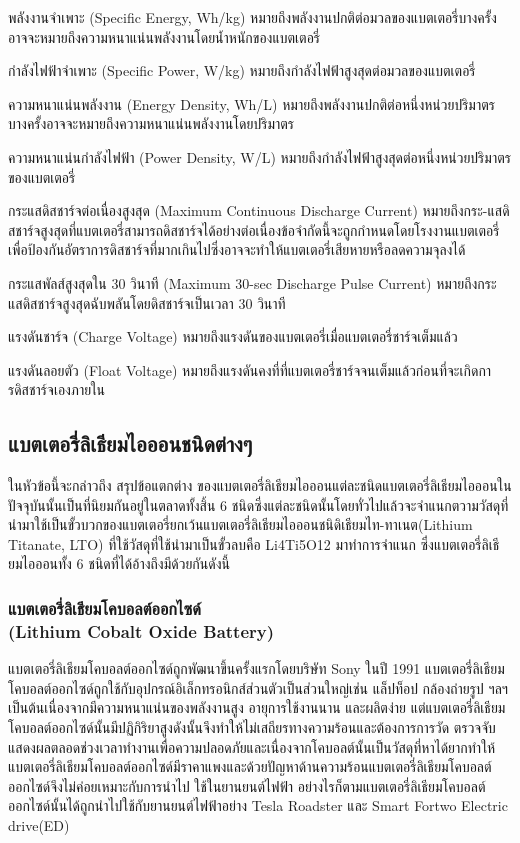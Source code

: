 \begin{itemize}
{		พลังงานจำเพาะ (Specific Energy, Wh/kg) หมายถึงพลังงานปกติต่อมวลของแบตเตอรี่บางครั้งอาจจะหมายถึงความหนาแน่นพลังงานโดยน้ำหนักของแบตเตอรี่}
	{\item
		กำลังไฟฟ้าจำเพาะ (Specific Power, W/kg) หมายถึงกำลังไฟฟ้าสูงสุดต่อมวลของแบตเตอรี่}
	{\item
		ความหนาแน่นพลังงาน (Energy Density, Wh/L) หมายถึงพลังงานปกติต่อหนึ่งหน่วยปริมาตรบางครั้งอาจจะหมายถึงความหนาแน่นพลังงานโดยปริมาตร}
	{\item
		ความหนาแน่นกำลังไฟฟ้า (Power Density, W/L) หมายถึงกำลังไฟฟ้าสูงสุดต่อหนึ่งหน่วยปริมาตรของแบตเตอรี่}
	{\item
		กระแสดิสชาร์จต่อเนื่องสูงสุด (Maximum Continuous Discharge Current) หมายถึงกระ-แสดิสชาร์จสูงสุดที่แบตเตอรี่สามารถดิสชาร์จได้อย่างต่อเนื่องข้อจำกัดนี้จะถูกกำหนดโดยโรงงานแบตเตอรี่เพื่อป้องกันอัตราการดิสชาร์จที่มากเกินไปซึ่งอาจจะทำให้แบตเตอรี่เสียหายหรือลดความจุลงได้}
	{\item
		กระแสพัลส์สูงสุดใน 30 วินาที (Maximum 30-sec Discharge Pulse Current) หมายถึงกระแสดิสชาร์จสูงสุดฉับพลันโดยดิสชาร์จเป็นเวลา 30 วินาที}
	{\item
		แรงดันชาร์จ (Charge Voltage) หมายถึงแรงดันของแบตเตอรี่เมื่อแบตเตอรี่ชาร์จเต็มแล้ว}
	{\item
		แรงดันลอยตัว (Float Voltage) หมายถึงแรงดันคงที่ที่แบตเตอรี่ชาร์จจนเต็มแล้วก่อนที่จะเกิดการดิสชาร์จเองภายใน}
\end{itemize}
\subsection{แบตเตอรี่ลิเธียมไอออนชนิดต่างๆ}
	ในหัวข้อนี้จะกล่าวถึง สรุปข้อแตกต่าง ของแบตเตอรี่ลิเธียมไอออนแต่ละชนิดแบตเตอรี่ลิเธียมไอออนในปัจจุบันนั้นเป็นที่นิยมกันอยู่ในตลาดทั้งสิ้น 6 ชนิดซึ่งแต่ละชนิดนั้นโดยทั่วไปแล้วจะจำแนกตวามวัสดุที่นำมาใช้เป็นขั้วบวกของแบตเตอรี่ยกเว้นแบตเตอรี่ลิเธียมไอออนชนิดิเธียมไท-ทาเนต(Lithium Titanate, LTO) ที่ใช้วัสดุที่ใช้นำมาเป็นขั้วลบคือ Li4Ti5O12 มาทำการจำแนก ซึ่งแบตเตอรี่ลิเธียมไอออนทั้ง 6 ชนิดที่ได้อ้างถึงมีด้วยกันดังนี้ 
\subsubsection*{แบตเตอรี่ลิเธียมโคบอลต์ออกไซด์\\ (Lithium Cobalt Oxide Battery)}
	แบตเตอรี่ลิเธียมโคบอลต์ออกไซด์ถูกพัฒนาขึ้นครั้งแรกโดยบริษัท Sony ในปี 1991 แบตเตอรี่ลิเธียมโคบอลต์ออกไซด์ถูกใช้กับอุปกรณ์อิเล็กทรอนิกส์ส่วนตัวเป็นส่วนใหญ่เช่น แล็ปท็อป กล้องถ่ายรูป ฯลฯ เป็นต้นเนื่องจากมีความหนาแน่นของพลังงานสูง อายุการใช้งานนาน และผลิตง่าย แต่แบตเตอรี่ลิเธียมโคบอลต์ออกไซด์นั้นมีปฏิกิริยาสูงดังนั้นจึงทำให้ไม่เสถียรทางความร้อนและต้องการการวัด ตรวจจับ แสดงผลตลอดช่วงเวลาทำงานเพื่อความปลอดภัยและเนื่องจากโคบอลต์นั้นเป็นวัสดุที่หาได้ยากทำให้แบตเตอรี่ลิเธียมโคบอลต์ออกไซด์มีราคาแพงและด้วยปัญหาด้านความร้อนแบตเตอรี่ลิเธียมโคบอลต์ออกไซด์จึงไม่ค่อยเหมาะกับการนำไป
ใช้ในยานยนต์ไฟฟ้า
\newline\hspace*{2cm}
อย่างไรก็ตามแบตเตอรี่ลิเธียมโคบอลต์ออกไซด์นั้นได้ถูกนำไปใช้กับยานยนต์ไฟฟ้าอย่าง Tesla Roadster และ Smart Fortwo Electric drive(ED)

